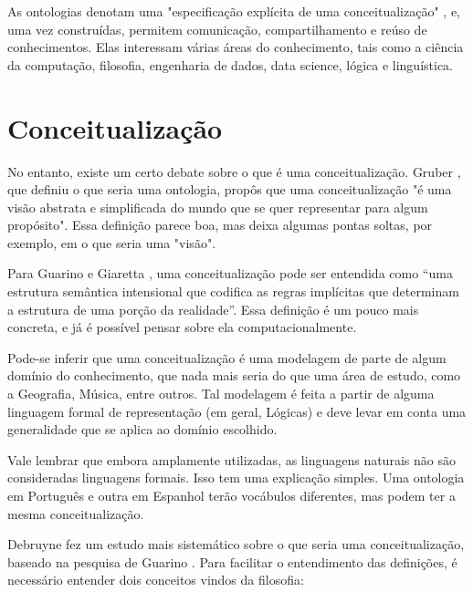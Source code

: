 As ontologias denotam uma "especificação explícita de uma conceitualização" \cite{ontoGruber}, e, uma vez construídas, permitem comunicação, compartilhamento e reúso de conhecimentos. Elas interessam várias áreas do conhecimento, tais como a ciência da computação, filosofia, engenharia de dados, data science, lógica e linguística.

\section{Conceitualização}
	
No entanto, existe um certo debate sobre o que é uma conceitualização. Gruber \cite{ontoGruber}, que definiu o que seria uma ontologia, propôs que uma conceitualização "é uma visão abstrata e simplificada do mundo que se quer representar para algum propósito". Essa definição parece boa, mas deixa algumas pontas soltas, por exemplo, em o que seria uma "visão".

Para Guarino e Giaretta \cite{ontoGiaretta}, uma conceitualização pode ser entendida como “uma estrutura semântica intensional que codifica as regras implícitas que determinam a estrutura de uma porção da realidade”. Essa definição é um pouco mais concreta, e já é possível pensar sobre ela computacionalmente.

Pode-se inferir que uma conceitualização é uma modelagem de parte de algum domínio do conhecimento, que nada mais seria do que uma área de estudo, como a Geografia, Música, entre outros. Tal modelagem é feita a partir de alguma linguagem formal de representação (em geral, Lógicas) e deve levar em conta uma generalidade que se aplica ao domínio escolhido.

Vale lembrar que embora amplamente utilizadas, as linguagens naturais não são consideradas linguagens formais. Isso tem uma explicação simples. Uma ontologia em Português e outra em Espanhol terão vocábulos diferentes, mas podem ter a mesma conceitualização.

Debruyne \cite{ontoDebruyne} fez um estudo mais sistemático sobre o que seria uma conceitualização, baseado na pesquisa de Guarino \cite{ontoGuarino}. Para facilitar o entendimento das definições, é necessário entender dois conceitos vindos da filosofia:

